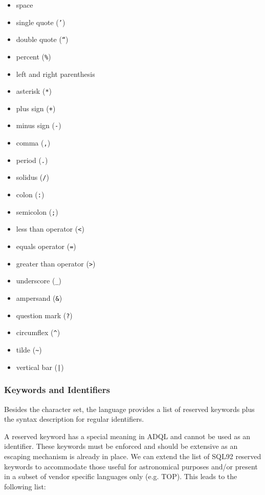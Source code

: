 \documentclass[11pt,a4paper]{ivoa}
\begin{document}
\begin{itemize}
    \item space
    \item single quote (\verb:’:)
    \item double quote (\verb:“:)
    \item percent (\verb:%:)
    \item left and right parenthesis
    \item asterisk (\verb:*:)
    \item plus sign (\verb:+:)
    \item minus sign (\verb:-:)
    \item comma (\verb:,:)
    \item period (\verb:.:)
    \item solidus (\verb:/:)
    \item colon (\verb.:.)
    \item semicolon (\verb:;:)
    \item less than operator (\verb:<:)
    \item equals operator (\verb:=:)
    \item greater than operator (\verb:>:)
    \item underscore (\verb:_:)
    \item ampersand (\verb:&:)
    \item question mark (\verb:?:)
    \item circumflex (\verb:^:)
    \item tilde (\verb:~:)
    \item vertical bar (\verb:|:)
\end{itemize}

\subsubsection{Keywords and Identifiers}
\label{sec:keywords}

Besides the character set, the language provides a list of reserved keywords
plus the syntax description for regular identifiers.

A reserved keyword has a special meaning in ADQL and cannot be used as
an identifier. These keywords must be enforced and should be extensive as
an escaping mechanism is already in place. We can extend the list of SQL92
reserved keywords to accommodate those useful for astronomical purposes and/or
present in a subset of vendor specific languages only (e.g. TOP). This leads
to the following list:
\end{document}
